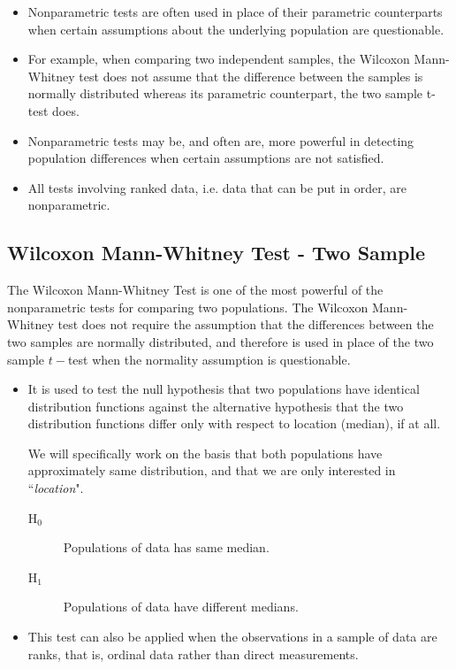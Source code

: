 \documentclass[12pt, a4paper]{report}
\theoremstyle{plain}
\theoremstyle{definition}
\theoremstyle{remark}
\begin{document}
\begin{itemize}
\item Nonparametric tests are often used in place of their parametric counterparts when certain
assumptions about the underlying population are questionable.

\item For example, when comparing two independent samples, the Wilcoxon Mann-Whitney test does
not assume that the difference between the samples is normally distributed whereas its parametric
counterpart, the two sample t-test does. 
\item Nonparametric tests may be, and often are, more powerful
in detecting population differences when certain assumptions are not satisfied.

\item All tests involving ranked data, i.e. data that can be put in order, are nonparametric.
\end{itemize}

\newpage



\subsection*{Wilcoxon Mann-Whitney Test - Two Sample}
The Wilcoxon Mann-Whitney Test is one of the most powerful of the nonparametric tests for
comparing two populations. The Wilcoxon Mann-Whitney test does not require the assumption that the differences between the two samples are normally distributed, and therefore is used in place of the two sample $t-$test when the normality assumption is questionable.

\begin{itemize}
\item It is used to test the null hypothesis that two populations have identical
distribution functions against the alternative hypothesis that the two distribution functions differ
only with respect to location (median), if at all. 


\begin{framed}
	We will specifically work on the basis that both populations have approximately same distribution, and that we are only interested in ``\textit{location}".
\begin{description}
	\item[H$_0$] Populations of data has same median.
	\item[H$_1$] Populations of data have different medians.
\end{description}
\end{framed}
\item This test can also be applied when the observations in a sample of data are ranks, that is,
ordinal data rather than direct measurements.
\end{itemize}
\end{document}
